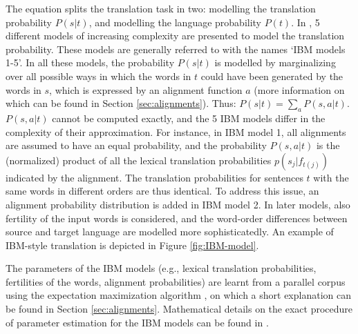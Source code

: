 The equation splits the translation task in two: modelling the translation probability $P(s|t)$, and modelling the language probability $P(t)$. In \cite{brown1993mathematics}, 5 different models of increasing complexity are presented to model the translation probability. These models are generally referred to with the names `IBM models 1-5'. In all these models, the probability $P(s|t)$ is modelled by marginalizing over all possible ways in which the words in $t$ could have been generated by the words in $s$, which is expressed by an alignment function $a$ (more information on which can be found in Section \ref{sec:alignments}). Thus: $P(s|t) = \sum_a P(s,a|t)$. $P(s,a|t)$ cannot be computed exactly, and the 5 IBM models differ in the complexity of their approximation. For instance, in IBM model 1, all alignments are assumed to have an equal probability, and the probability $P(s,a|t)$ is the (normalized) product of all the lexical translation probabilities $p(s_j|f_{t(j)})$ indicated by the alignment. The translation probabilities for sentences $t$ with the same words in different orders are thus identical. To address this issue, an alignment probability distribution is added in IBM model 2. In later models, also fertility of the input words is considered, and the word-order differences between source and target language are modelled more sophisticatedly. An example of IBM-style translation is depicted in Figure \ref{fig:IBM-model}.

The parameters of the IBM models (e.g., lexical translation probabilities, fertilities of the words, alignment probabilities) are learnt from a parallel corpus using the expectation maximization algorithm \citep{dempster1977maximum}, on which a short explanation can be found in Section \ref{sec:alignments}. Mathematical details on the exact procedure of parameter estimation for the IBM models can be found in \cite{brown1993mathematics}.

